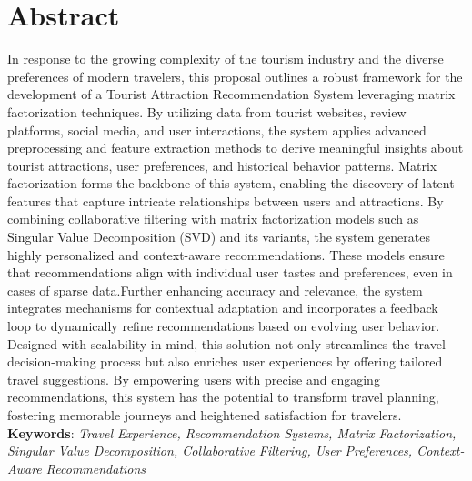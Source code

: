 		
		
		\large
			\chapter*{Abstract}
		\normalsize
        \noindent
        In response to the growing complexity of the tourism industry and the diverse preferences of modern travelers, this proposal outlines a robust framework for the development of a Tourist Attraction Recommendation System leveraging matrix factorization techniques. By utilizing data from tourist websites, review platforms, social media, and user interactions, the system applies advanced preprocessing and feature extraction methods to derive meaningful insights about tourist attractions, user preferences, and historical behavior patterns. 
        Matrix factorization forms the backbone of this system, enabling the discovery of latent features that capture intricate relationships between users and attractions. By combining collaborative filtering with matrix factorization models such as Singular Value Decomposition (SVD) and its variants, the system generates highly personalized and context-aware recommendations. These models ensure that recommendations align with individual user tastes and preferences, even in cases of sparse data.Further enhancing accuracy and relevance, the system integrates mechanisms for contextual adaptation and incorporates a feedback loop to dynamically refine recommendations based on evolving user behavior. Designed with scalability in mind, this solution not only streamlines the travel decision-making process but also enriches user experiences by offering tailored travel suggestions. By empowering users with precise and engaging recommendations, this system has the potential to transform travel planning, fostering memorable journeys and heightened satisfaction for travelers. \\
        \textbf{Keywords}:  
        \textit{Travel Experience, Recommendation Systems, Matrix Factorization, Singular Value Decomposition, Collaborative Filtering, User Preferences, Context-Aware Recommendations}

